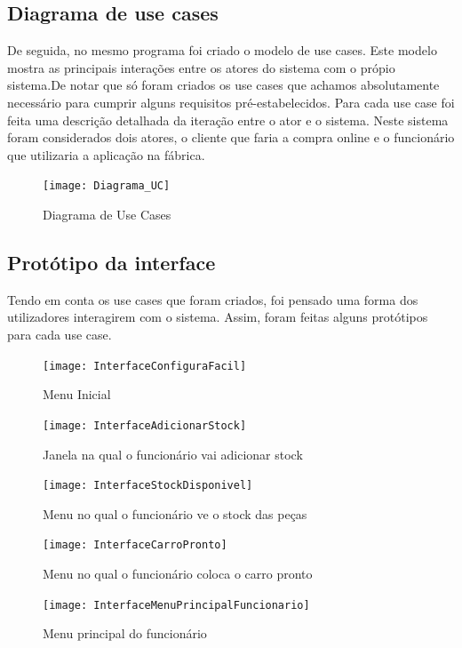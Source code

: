 \documentclass[10pt, a4paper]{article}
\begin{document}
\subsection{Diagrama de use cases}
De seguida, no mesmo programa foi criado o modelo de use cases. Este modelo mostra as principais interações entre os atores do sistema com o própio sistema.De notar que só foram criados os use cases que achamos absolutamente necessário para cumprir alguns requisitos pré-estabelecidos. Para cada use case foi feita uma descrição detalhada da iteração entre o ator e o sistema. Neste sistema foram considerados dois atores, o cliente que faria a compra online e o funcionário que utilizaria a aplicação na fábrica.

\begin{figure}[!htb]
\centering
\texttt{[image: Diagrama\_UC]}
\caption{Diagrama de Use Cases}
\label{Diagrama UC}
\end{figure}

\newpage
\subsection{Protótipo da interface}
Tendo em conta os use cases que foram criados, foi pensado uma forma dos utilizadores interagirem com o sistema. Assim, foram feitas alguns protótipos para cada use case.

\begin{figure}[!htb]
\centering
\texttt{[image: InterfaceConfiguraFacil]}
\caption{Menu Inicial}
\label{Menu I}
\end{figure}

\begin{figure}[!htb]
\centering
\texttt{[image: InterfaceAdicionarStock]}
\caption{Janela na qual o funcionário vai adicionar stock}
\label{Menu AS}
\end{figure}

\begin{figure}[!htb]
\centering
\texttt{[image: InterfaceStockDisponivel]}
\caption{Menu no qual o funcionário ve o stock das peças}
\label{Menu SD}
\end{figure}

\begin{figure}[!htb]
\centering
\texttt{[image: InterfaceCarroPronto]}
\caption{Menu no qual o funcionário coloca o carro pronto}
\label{Menu CP}
\end{figure}

\begin{figure}[!htb]
\centering
\texttt{[image: InterfaceMenuPrincipalFuncionario]}
\caption{Menu principal do funcionário}
\label{Menu PF}
\end{figure}
\end{document}

